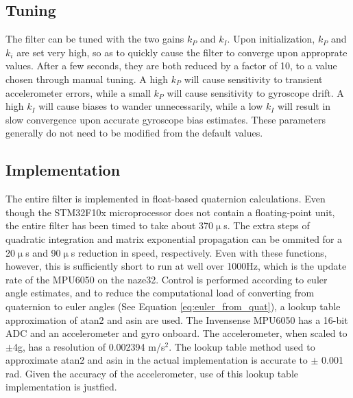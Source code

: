 \documentclass[paper=a4, fontsize=11pt]{scrartcl} %
\numberwithin{equation}{section} %
\numberwithin{figure}{section} %
\numberwithin{table}{section} %
\begin{document}
\subsection{Tuning}
The filter can be tuned with the two gains $k_P$ and $k_I$.  Upon initialization, $k_P$ and $k_i$ are set very high, so as to quickly cause the filter to converge upon approprate values.  After a few seconds, they are both reduced by a factor of 10, to a value chosen through manual tuning.  A high $k_P$ will cause sensitivity to transient accelerometer errors, while a small $k_P$ will cause sensitivity to gyroscope drift.  A high $k_I$ will cause biases to wander unnecessarily, while a low $k_I$ will result in slow convergence upon accurate gyroscope bias estimates.  These parameters generally do not need to be modified from the default values.

\subsection{Implementation}
The entire filter is implemented in float-based quaternion calculations.  Even though the STM32F10x microprocessor does not contain a floating-point unit, the entire filter has been timed to take about 370$\upmu$s.  The extra steps of quadratic integration and matrix exponential propagation can be ommited for a 20$\upmu$s and 90$\upmu$s reduction in speed, respectively.  Even with these functions, however, this is sufficiently short to run at well over 1000Hz, which is the update rate of the MPU6050 on the naze32.
Control is performed according to euler angle estimates, and to reduce the computational load of converting from quaternion to euler angles (See Equation \ref{eq:euler_from_quat}), a lookup table approximation of atan2 and asin are used.  The Invensense MPU6050 has a 16-bit ADC and an accelerometer and gyro onboard.  The accelerometer, when scaled to $\pm$4g, has a resolution of 0.002394 m/s$^2$.  The lookup table method used to approximate atan2 and asin in the actual implementation is accurate to $\pm$ 0.001 rad.  Given the accuracy of the accelerometer, use of this lookup table implementation is justfied.



\end{document}
